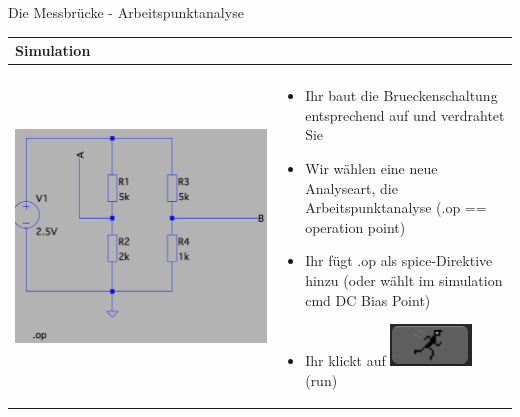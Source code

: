     

\begin{frame}[t]{Die Messbrücke - Arbeitspunktanalyse} 
    
    \begin{spacing}{0.9} \begin{tiny}
    \begin{table}[h!]
      \begin{tabular}{p{3cm} p{7cm}}
        \hline
        \textbf{Simulation} & \\
        \hline \\
        \begin{minipage}{.3\textwidth}
         \includegraphics[width=\linewidth]{pictures/bridge_op_2.png}
       \end{minipage} 
       & 
       \begin{minipage}{.7\textwidth}
       \begin{itemize}
         \item Ihr baut die Brueckenschaltung entsprechend auf und verdrahtet Sie
         \item Wir wählen eine neue Analyseart, die Arbeitspunktanalyse \newline(.op == operation point)
         \item Ihr fügt .op als spice-Direktive hinzu \newline(oder wählt im simulation cmd DC Bias Point)
         \item Ihr klickt auf \includegraphics[scale=0.3]{pictures/run.png} (run)

\end{itemize}
\end{minipage}
\end{tabular}
\end{table}
\end{tiny}
\end{spacing}
\end{frame}

